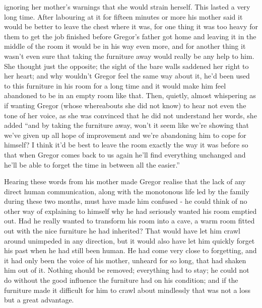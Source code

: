 \documentclass[12pt]{report}
\begin{document}
ignoring her mother's warnings that she would strain herself. This
lasted a very long time. After labouring at it for fifteen minutes or
more his mother said it would be better to leave the chest where it was,
for one thing it was too heavy for them to get the job finished before
Gregor's father got home and leaving it in the middle of the room it
would be in his way even more, and for another thing it wasn't even sure
that taking the furniture away would really be any help to him. She
thought just the opposite; the sight of the bare walls saddened her
right to her heart; and why wouldn't Gregor feel the same way about it,
he'd been used to this furniture in his room for a long time and it
would make him feel abandoned to be in an empty room like that. Then,
quietly, almost whispering as if wanting Gregor (whose whereabouts she
did not know) to hear not even the tone of her voice, as she was
convinced that he did not understand her words, she added ``and by
taking the furniture away, won't it seem like we're showing that we've
given up all hope of improvement and we're abandoning him to cope for
himself? I think it'd be best to leave the room exactly the way it was
before so that when Gregor comes back to us again he'll find everything
unchanged and he'll be able to forget the time in between all the
easier.''

Hearing these words from his mother made Gregor realise that the lack of
any direct human communication, along with the monotonous life led by
the family during these two months, must have made him confused - he
could think of no other way of explaining to himself why he had
seriously wanted his room emptied out. Had he really wanted to transform
his room into a cave, a warm room fitted out with the nice furniture he
had inherited? That would have let him crawl around unimpeded in any
direction, but it would also have let him quickly forget his past when
he had still been human. He had come very close to forgetting, and it
had only been the voice of his mother, unheard for so long, that had
shaken him out of it. Nothing should be removed; everything had to stay;
he could not do without the good influence the furniture had on his
condition; and if the furniture made it difficult for him to crawl about
mindlessly that was not a loss but a great advantage.
\end{document}
